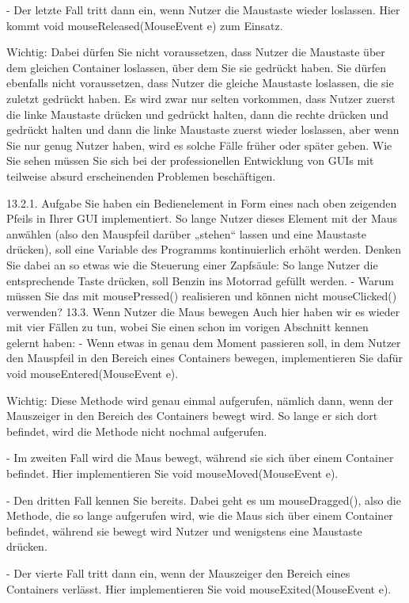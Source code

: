 -	Der letzte Fall tritt dann ein, wenn Nutzer die Maustaste wieder loslassen. Hier kommt 
void mouseReleased(MouseEvent e) zum Einsatz.

Wichtig: Dabei dürfen Sie nicht voraussetzen, dass Nutzer die Maustaste über dem gleichen Container loslassen, über dem Sie sie gedrückt haben. Sie dürfen ebenfalls nicht voraussetzen, dass Nutzer die gleiche Maustaste loslassen, die sie zuletzt gedrückt haben. Es wird zwar nur selten vorkommen, dass Nutzer zuerst die linke Maustaste drücken und gedrückt halten, dann die rechte drücken und gedrückt halten und dann die linke Maustaste zuerst wieder loslassen, aber wenn Sie nur genug Nutzer haben, wird es solche Fälle früher oder später geben. Wie Sie sehen müssen Sie sich bei der professionellen Entwicklung von GUIs mit teilweise absurd erscheinenden Problemen beschäftigen.

13.2.1.	Aufgabe
Sie haben ein Bedienelement in Form eines nach oben zeigenden Pfeils in Ihrer GUI implementiert. So lange Nutzer dieses Element mit der Maus anwählen (also den Mauspfeil darüber „stehen“ lassen und eine Maustaste drücken), soll eine Variable des Programms kontinuierlich erhöht werden. Denken Sie dabei an so etwas wie die Steuerung einer Zapfsäule: So lange Nutzer die entsprechende Taste drücken, soll Benzin ins Motorrad gefüllt werden.
-	Warum müssen Sie das mit mousePressed() realisieren und können nicht mouseClicked() verwenden?
13.3.	Wenn Nutzer die Maus bewegen
Auch hier haben wir es wieder mit vier Fällen zu tun, wobei Sie einen schon im vorigen Abschnitt kennen gelernt haben:
-	Wenn etwas in genau dem Moment passieren soll, in dem Nutzer den Mauspfeil in den Bereich eines Containers bewegen, implementieren Sie dafür 
void mouseEntered(MouseEvent e).

Wichtig: Diese Methode wird genau einmal aufgerufen, nämlich dann, wenn der Mauszeiger in den Bereich des Containers bewegt wird. So lange er sich dort befindet, wird die Methode nicht nochmal aufgerufen.

-	Im zweiten Fall wird die Maus bewegt, während sie sich über einem Container befindet. Hier implementieren Sie void mouseMoved(MouseEvent e).

-	Den dritten Fall kennen Sie bereits. Dabei geht es um mouseDragged(), also die Methode, die so lange aufgerufen wird, wie die Maus sich über einem Container befindet, während sie bewegt wird Nutzer und wenigstens eine Maustaste drücken.

-	Der vierte Fall tritt dann ein, wenn der Mauszeiger den Bereich eines Containers verlässt. Hier implementieren Sie void mouseExited(MouseEvent e).

